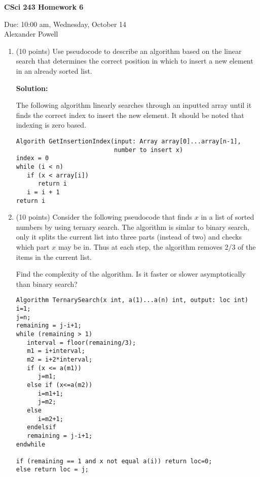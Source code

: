 \documentclass[11pt]{article}
\begin{document}
\begin{center}             %
\begin{LARGE}
{\bf CSci 243 Homework 6}
\end{LARGE}
\vskip 0.25cm      %

Due: 10:00 am, Wednesday, October 14 \\  %
Alexander Powell
\end{center}

\begin{enumerate}

\item (10 points) 
Use pseudocode to describe an algorithm based on the linear search that
  determines the correct position in which to insert a new element in 
  an already sorted list.

\textbf{Solution: }

The following algorithm linearly searches through an inputted array until it finds the correct index to insert the new element.  It should be noted that indexing is zero based.  

\begin{verbatim}
Algorith GetInsertionIndex(input: Array array[0]...array[n-1],
                           number to insert x)
index = 0
while (i < n)
   if (x < array[i])
      return i
   i = i + 1
return i
\end{verbatim}

\item (10 points) 
Consider the following pseudocode that finds $x$ in a list of sorted
numbers by using ternary search. The algorithm is simlar to binary search, 
only it splits the current list into three parts (instead of two) and checks 
which part $x$ may be in. Thus at each step, the algorithm removes 2/3 of 
the items in the current list.

Find the complexity of the algorithm. Is it faster or slower asymptotically 
than binary search?

\begin{verbatim}
Algorithm TernarySearch(x int, a(1)...a(n) int, output: loc int)
i=1; 
j=n;
remaining = j-i+1;
while (remaining > 1)
   interval = floor(remaining/3);
   m1 = i+interval;
   m2 = i+2*interval;
   if (x <= a(m1)) 
      j=m1;
   else if (x<=a(m2))
      i=m1+1;
      j=m2;
   else 
      i=m2+1;
   endelsif
   remaining = j-i+1;
endwhile

if (remaining == 1 and x not equal a(i)) return loc=0;
else return loc = j;
\end{verbatim}


\end{enumerate}
\end{document}
